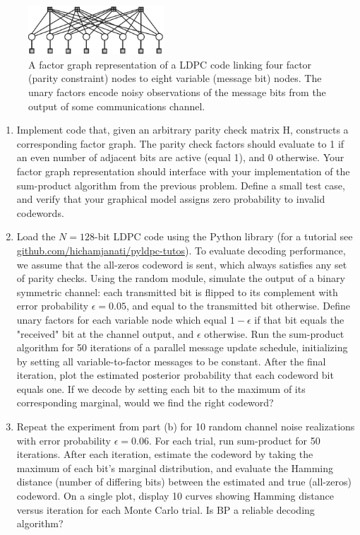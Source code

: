 \documentclass{article}
\begin{document}
\begin{enumerate}
\begin{figure}[t]
\centering
\includegraphics[width=2in]{brown_hw2}
\caption{A factor graph representation of a LDPC code linking four factor (parity constraint)
nodes to eight variable (message bit) nodes. The unary factors encode noisy observations of the
message bits from the output of some communications channel. \cite{Brown}}
\label{fig:factor}
\end{figure}

\begin{enumerate}
\item Implement code that, given an arbitrary parity check matrix H, constructs a corresponding factor graph. The parity check factors should evaluate to 1 if an even number of adjacent bits are active (equal 1), and 0 otherwise. Your factor graph representation should interface with your implementation of the sum-product algorithm from the previous problem. Define a small test case, and verify that your graphical model assigns zero probability to invalid codewords.
\item Load the $N = 128$-bit LDPC code using the Python library  (for a tutorial see \url {github.com/hichamjanati/pyldpc-tutos}).  To evaluate decoding
performance, we assume that the all-zeros codeword is sent, which always satisfies any set of parity checks. Using the random module, simulate the output of a binary symmetric
channel: each transmitted bit is flipped to its complement with error probability $\epsilon =0.05$, and equal to the transmitted bit otherwise. Define unary factors for each variable node
which equal $1-\epsilon$ if that bit equals the "received" bit at the channel output, and $\epsilon$ otherwise. Run the sum-product algorithm for 50 iterations of a parallel message update schedule, initializing by setting all variable-to-factor messages to be constant. After the final iteration, plot the estimated posterior probability that each codeword bit equals one.
If we decode by setting each bit to the maximum of its corresponding marginal, would we find the right codeword?
\item Repeat the experiment from part (b) for 10 random channel noise realizations with error probability $\epsilon= 0.06$. For each trial, run sum-product for 50 iterations. After each iteration, estimate the codeword by taking the maximum of each bit's marginal distribution, and evaluate the Hamming distance (number of differing bits) between the estimated and true (all-zeros) codeword. On a single plot, display 10 curves showing Hamming distance versus iteration for each Monte Carlo trial. Is BP a reliable decoding algorithm?

\end{enumerate}
\end{enumerate}
\end{document}
